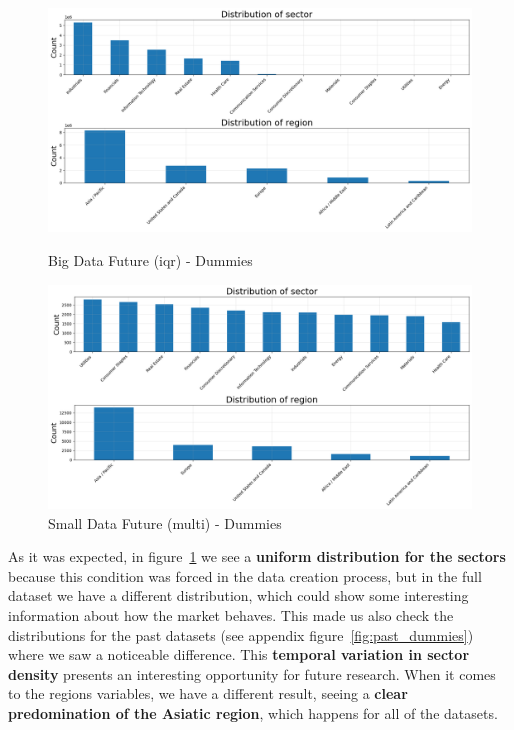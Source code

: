 \documentclass[11pt,english,a4paper,hidelinks]{book}
\begin{document}
\begin{figure}[H]
    \centering
    \begin{minipage}{0.48\textwidth}
        \centering
        \includegraphics[width=1\linewidth]{images/code/descriptive analysis/distributions/Big Data future - Dummies.png}
        \caption{Big Data Future (\acrshort{iqr}) - Dummies}
        \label{fig:big_future_dummies}
    \end{minipage}\hfill
    \begin{minipage}{0.48\textwidth}
        \centering
        \includegraphics[width=1\linewidth]{images/code/descriptive analysis/distributions/Small Data future MCOD - Dummies.png}
        \caption{Small Data Future (\acrshort{multi}) - Dummies}
        \label{fig:small_future_dummies}
    \end{minipage}
\end{figure}

\noindent As it was expected, in figure~\ref{fig:small_future_dummies} we see a \textbf{uniform distribution for the sectors} because this condition was forced in the data creation process, but in the full dataset we have a different distribution, which could show some interesting information about how the market behaves. This made us also check the distributions for the past datasets (see appendix figure~\ref{fig:past_dummies}) where we saw a noticeable difference. This \textbf{temporal variation in sector density} presents an interesting opportunity for future research. When it comes to the regions variables, we have a different result, seeing a \textbf{clear predomination of the Asiatic region}, which happens for all of the datasets. 
\end{document}
